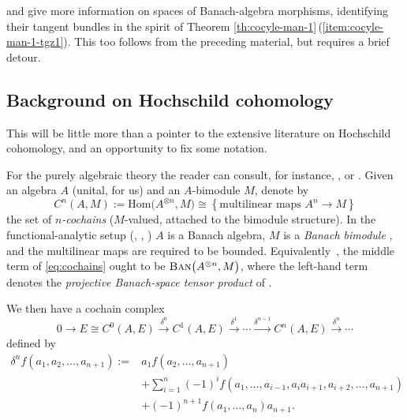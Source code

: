 \documentclass[pdftex]{sigma}
\numberwithin{equation}{section}
\newcommand{\cat}[1]{\text{\sc #1}}
\begin{document}
\cite[Theorem 8.2.3]{run-lec} and \cite[Theorem 4.5]{cg-amen} give more information on spaces of Banach-algebra morphisms, identifying their tangent bundles in the spirit of Theorem \ref{th:cocyle-man-1}\,(\ref{item:cocyle-man-1-tgz1}). This too follows from the preceding material, but requires a brief detour.

\subsection{Background on Hochschild cohomology}\label{subse:hoch}

This will be little more than a pointer to the extensive literature on Hochschild cohomology, and an opportunity to fix some notation.

For the purely algebraic theory the reader can consult, for instance, \cite[Section~1.9]{dales}, \cite[Chapter 11; especially Section~11.1]{pierce} or \cite[Sections~4 and 5]{ginz-ncg}. Given an algebra $A$ (unital, for us) and an $A$-bimodule $M$, denote by
\begin{equation}\label{eq:cochains}
 C^n(A,M):=\mathrm{Hom}\big(A^{\otimes n},M\big) \cong \left\{\text{multilinear maps }A^n\to M\right\}
\end{equation}
the set of {\it $n$-cochains} ($M$-valued, attached to the bimodule structure). In the functional-analytic setup (\cite[Section~1]{john-coh}, \cite[Section~2.8]{dales}, \cite[Section~7]{dael}) $A$ is a Banach algebra, $M$ is a {\it Banach bimodule} \cite[Definition 2.6.1]{dales}, and the multilinear maps are required to be bounded. Equivalently~\cite[Theorem 2.9]{ryan}, the middle term of \eqref{eq:cochains} ought to be $\cat{Ban}\big(A^{\otimes n},M\big)$,
where the left-hand term denotes the {\it projective Banach-space tensor product} of \cite[Section~2.1]{ryan}.

We then have a cochain complex
\begin{equation}\label{eq:hochcoc}
 0\xrightarrow{}
 E\cong C^0(A,E)
 \xrightarrow{\delta^0}
 C^1(A,E)
 \xrightarrow{\delta^1}
 \cdots \xrightarrow{\delta^{n-1}}
 C^n(A,E)
 \xrightarrow{\delta^n}
 \cdots
\end{equation}
defined by
\begin{align*}
 \delta^n f (a_1,a_2,\dots,a_{n+1}):={}& a_1 f(a_2,\dots,a_{n+1})\\
 &+\sum_{i=1}^{n} (-1)^{i} f(a_1,\dots,a_{i-1},a_i a_{i+1},a_{i+2},\dots,a_{n+1})\\
 &+(-1)^{n+1} f(a_1,\dots,a_n)a_{n+1}.
\end{align*}
\end{document}
